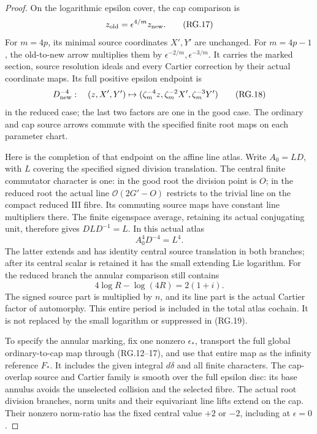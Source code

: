 \begin{proof}
On the logarithmic epsilon cover, the cap comparison is
\[
 z_{\rm old}=\epsilon^{4/m}z_{\rm new}.
                                                        \tag{RG.17}
\]
For \(m=4p\), its minimal source coordinates \(X',Y'\) are
unchanged. For \(m=4p-1\), the old-to-new arrow multiplies
them by \(\epsilon^{-2/m},\epsilon^{-3/m}\). It carries the
marked section, source resolution ideals and every Cartier
correction by their actual coordinate maps. Its full positive
epsilon endpoint is
\[
 D_{\rm new}^{-4}:\quad
 (z,X',Y')\mapsto
 (\zeta_m^{-4}z,\zeta_m^{-2}X',\zeta_m^{-3}Y')
                                                        \tag{RG.18}
\]
in the reduced case; the last two factors are one in the good
case. The ordinary and cap source arrows commute with the
specified finite root maps on each parameter chart.

Here is the completion of that endpoint on the affine line
atlas. Write \(A_0=L D\), with \(L\) covering the specified
signed division translation. The central finite commutator
character is one: in the good root the division point is \(O\);
in the reduced root the actual line
\(\mathcal O(2G'-O)\) restricts to the trivial line on the
compact reduced III fibre. Its commuting source maps have
constant line multipliers there. The finite eigenspace
average, retaining its actual conjugating unit, therefore
gives \(DLD^{-1}=L\). In this actual atlas
\[
                         A_0^4D^{-4}=L^4.
                                                        \tag{RG.19}
\]
The latter extends and has identity central source translation
in both branches; after its central scalar is retained it has
the small extending Lie logarithm. For the reduced branch the
annular comparison still contains
\[
                    4\log R-\log(4R)=2(1+i).
                                                        \tag{RG.20}
\]
The signed source part is multiplied by \(n\), and its line
part is the actual Cartier factor of automorphy. This entire
period is included in the total atlas cochain. It is not
replaced by the small logarithm or suppressed in (RG.19).

To specify the annular marking, fix one nonzero
\(\epsilon_*\), transport the full global ordinary-to-cap
map through (RG.12--17), and use that entire map as the
infinity reference \(F_*\). It includes the given integral
\(d\delta\) and all finite characters. The cap-overlap source
and Cartier family is smooth over the full epsilon disc:
its base annulus avoids the unselected collision and the
selected fibre. The actual root division branches, norm
units and their equivariant line lifts extend on the cap.
Their nonzero norm-ratio has the fixed central value \(+2\)
or \(-2\), including at \(\epsilon=0\).


\end{proof}

